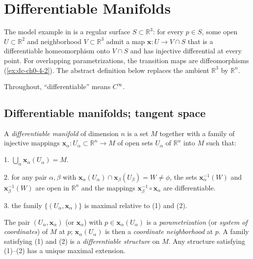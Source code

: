 \chapter{Differentiable Manifolds}
\label{chap:dc-differentiable-manifolds}

The model example in \cite{doCarmo} is a regular surface $S\subset\mathbb{R}^3$:
for every $p\in S$, some open $U\subset\mathbb{R}^2$ and neighborhood
$V\subset\mathbb{R}^3$ admit a map
$\mathbf{x}:U\to V\cap S$ that is a differentiable homeomorphism onto $V\cap S$ and
has injective differential at every point. For overlapping parametrizations, the
transition maps are diffeomorphisms (\cref{ex:dc-ch0-4-2}). The abstract definition
below replaces the ambient $\mathbb{R}^3$ by $\mathbb{R}^n$.

Throughout, ``differentiable'' means $C^\infty$.

\section{Differentiable manifolds; tangent space}

\begin{definition}
  \label{def:dc-ch0-2-1}
  \leanok
  A \emph{differentiable manifold} of dimension $n$ is a set $M$ together with a family
  of injective mappings $\mathbf{x}_\alpha:U_\alpha\subset\mathbb{R}^n\to M$ of open
  sets $U_\alpha$ of $\mathbb{R}^n$ into $M$ such that:
  
  1. $\bigcup_\alpha\mathbf{x}_\alpha(U_\alpha)=M$.
  
  2. for any pair $\alpha,\beta$ with
     $\mathbf{x}_\alpha(U_\alpha)\cap\mathbf{x}_\beta(U_\beta)=W\neq\phi$, the sets
     $\mathbf{x}_\alpha^{-1}(W)$ and $\mathbf{x}_\beta^{-1}(W)$ are open in
     $\mathbb{R}^n$ and the mappings $\mathbf{x}_\beta^{-1}\circ\mathbf{x}_\alpha$
     are differentiable.
  
  3. the family $\{(U_\alpha,\mathbf{x}_\alpha)\}$ is maximal relative to (1) and (2).
  
  The pair $(U_\alpha,\mathbf{x}_\alpha)$ (or $\mathbf{x}_\alpha$) with
  $p\in\mathbf{x}_\alpha(U_\alpha)$ is a \emph{parametrization} (or \emph{system of
  coordinates}) of $M$ at $p$; $\mathbf{x}_\alpha(U_\alpha)$ is then a \emph{coordinate
  neighborhood} at $p$. A family satisfying (1) and (2) is a \emph{differentiable
  structure} on $M$. Any structure satisfying (1)--(2) has a unique maximal extension.
\end{definition}

